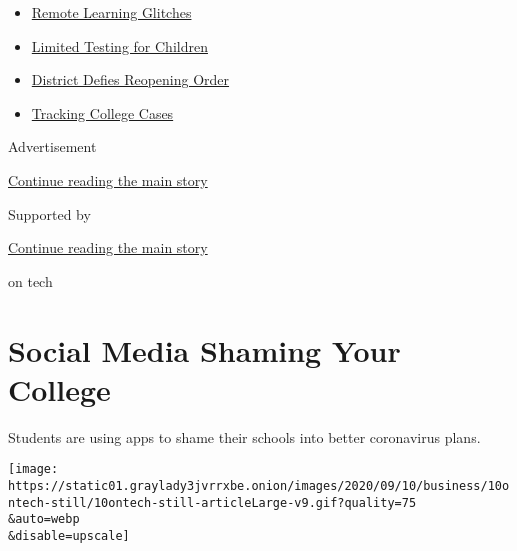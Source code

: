 \begin{itemize}
\tightlist
\item
  \href{https://www.nytimes3xbfgragh.onion/2020/09/08/us/school-districts-cyberattacks-glitches.html?name=styln-coronavirus-schools-reopening\&region=TOP_BANNER\&block=storyline_menu_recirc\&action=click\&pgtype=Article\&impression_id=bd7fff60-f4bd-11ea-b11e-678a241facd9\&variant=undefined}{Remote
  Learning Glitches}
\item
  \href{https://www.nytimes3xbfgragh.onion/2020/09/08/upshot/children-testing-shortfalls-virus.html?name=styln-coronavirus-schools-reopening\&region=TOP_BANNER\&block=storyline_menu_recirc\&action=click\&pgtype=Article\&impression_id=bd7fff61-f4bd-11ea-b11e-678a241facd9\&variant=undefined}{Limited
  Testing for Children}
\item
  \href{https://www.nytimes3xbfgragh.onion/2020/09/10/us/des-moines-school-opening-coronavirus.html?name=styln-coronavirus-schools-reopening\&region=TOP_BANNER\&block=storyline_menu_recirc\&action=click\&pgtype=Article\&impression_id=bd7fff62-f4bd-11ea-b11e-678a241facd9\&variant=undefined}{District
  Defies Reopening Order}
\item
  \href{https://www.nytimes3xbfgragh.onion/interactive/2020/us/covid-college-cases-tracker.html?name=styln-coronavirus-schools-reopening\&region=TOP_BANNER\&block=storyline_menu_recirc\&action=click\&pgtype=Article\&impression_id=bd7fff63-f4bd-11ea-b11e-678a241facd9\&variant=undefined}{Tracking
  College Cases}
\end{itemize}

Advertisement

\protect\hyperlink{after-top}{Continue reading the main story}

Supported by

\protect\hyperlink{after-sponsor}{Continue reading the main story}

on tech

\hypertarget{social-media-shaming-your-college}{%
\section{Social Media Shaming Your
College}\label{social-media-shaming-your-college}}

Students are using apps to shame their schools into better coronavirus
plans.

\texttt{[image: https://static01.graylady3jvrrxbe.onion/images/2020/09/10/business/10ontech-still/10ontech-still-articleLarge-v9.gif?quality=75\\\&auto=webp\\\&disable=upscale]}

